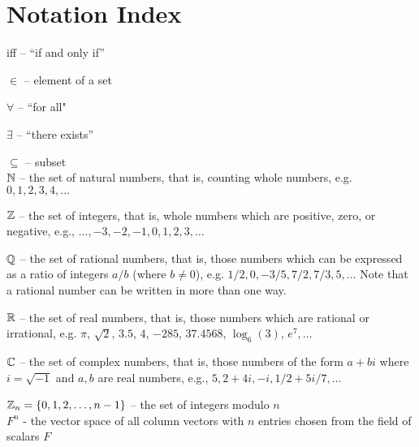 \chapter{Notation Index}\label{apx:notation} %
\ctrlT iff -- ``if and only if''

\ctrlT $\in$ -- element of a set

\ctrlT $\forall$ -- ``for all"

\ctrlT $\exists$ -- ``there exists''

\ctrlT $\subseteq$ -- subset\\

\ctrlT $\mathbb{N}$\label{note:natural} -- the set of natural numbers, that is, counting whole numbers, e.g. $0, 1, 2, 3, 4, \ldots$

\ctrlT $\mathbb{Z}$\label{note:integers} -- the set of integers, that is, whole numbers which are positive, zero, or negative, e.g.,  $\ldots, -3, -2, -1, 0, 1, 2, 3,\ldots$

\ctrlT $\mathbb{Q}$\label{note:rational} -- the set of rational numbers, that is, those numbers which can be expressed as a ratio of integers $a/b$ (where $b\neq 0$), e.g. $1/2, 0, -3/5, 7/2, 7/3, 5, \ldots$ Note that a rational number can be written in more than one way.

\ctrlT $\mathbb{R}$\label{note:real} -- the set of real numbers, that is, those numbers which are rational or irrational, e.g. $\pi$, $\sqrt{2}$, $3.5$, $4$, $-285$, $37.4568$, $\log_6(3)$, $e^7, \ldots$

\ctrlT $\mathbb{C}$\label{note:complex} -- the set of complex numbers, that is, those numbers of the form $a+bi$ where $i=\sqrt{-1}$ and $a,b$ are real numbers, e.g., $5, 2+4i, -i, 1/2 + 5i/7, \ldots$

\ctrlT $\mathbb{Z}_n = \{0, 1, 2, \ldots, n-1\}$\label{note:mod} -- the set of integers modulo $n$\\

\ctrlT $F^n$\label{note:Fn} - the vector space of all column vectors with $n$ entries chosen from the field of scalars $F$

